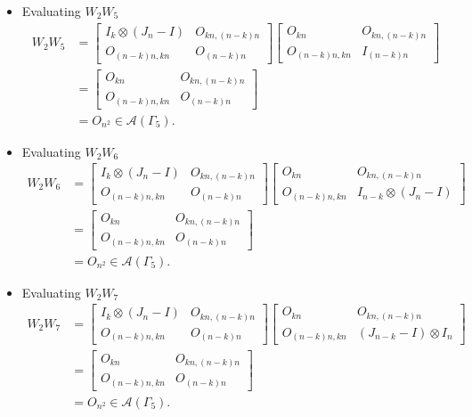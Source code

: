 \begin{itemize}
\item Evaluating $W_{2}W_{5}$
\begin{align*}
W_2W_5 &=
\begin{bmatrix}
I_k \otimes (J_n - I) & O_{kn, (n-k)n} \\
O_{(n-k)n,kn} & O_{(n-k)n}
\end{bmatrix}
\begin{bmatrix}
O_{kn} & O_{kn, (n-k)n} \\
O_{(n-k)n,kn} & I_{(n - k)n}
\end{bmatrix}\\
&= \begin{bmatrix}
O_{kn} & O_{kn, (n-k)n} \\
O_{(n-k)n,kn} & O_{(n - k)n}
\end{bmatrix}\\
&= O_{n^2} \in\mathcal{A}(\Gamma_5).
\end{align*}

\item Evaluating $W_{2}W_{6}$
\begin{align*}
W_2W_6 &=
\begin{bmatrix}
I_k \otimes (J_n - I) & O_{kn, (n-k)n} \\
O_{(n-k)n,kn} & O_{(n-k)n}
\end{bmatrix}
\begin{bmatrix}
O_{kn} & O_{kn, (n-k)n} \\
O_{(n-k)n,kn} & I_{n-k} \otimes (J_n - I)
\end{bmatrix}\\
&= \begin{bmatrix}
O_{kn} & O_{kn, (n-k)n} \\
O_{(n-k)n,kn} & O_{(n - k)n}
\end{bmatrix}\\
&= O_{n^2} \in\mathcal{A}(\Gamma_5).
\end{align*}

\item Evaluating $W_{2}W_{7}$
\begin{align*}
W_2W_7 &=
\begin{bmatrix}
I_k \otimes (J_n - I) & O_{kn, (n-k)n} \\
O_{(n-k)n,kn} & O_{(n-k)n}
\end{bmatrix}
\begin{bmatrix}
O_{kn} & O_{kn, (n-k)n} \\
O_{(n-k)n,kn} & (J_{n-k} - I) \otimes I_n
\end{bmatrix}\\
&= \begin{bmatrix}
O_{kn} & O_{kn, (n-k)n} \\
O_{(n-k)n,kn} & O_{(n - k)n}
\end{bmatrix}\\
&= O_{n^2} \in\mathcal{A}(\Gamma_5).
\end{align*}


\end{itemize}
